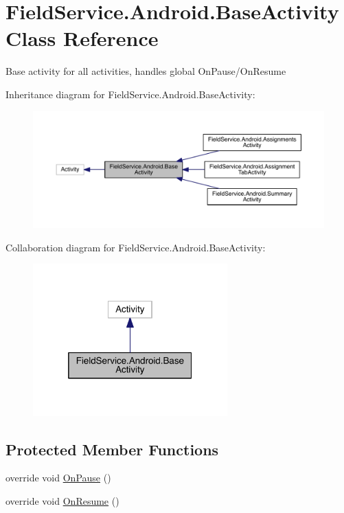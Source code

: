 \hypertarget{class_field_service_1_1_android_1_1_base_activity}{\section{Field\+Service.\+Android.\+Base\+Activity Class Reference}
\label{class_field_service_1_1_android_1_1_base_activity}
}


Base activity for all activities, handles global On\+Pause/\+On\+Resume  




Inheritance diagram for Field\+Service.\+Android.\+Base\+Activity\+:
\nopagebreak
\begin{figure}[H]
\begin{center}
\leavevmode
\includegraphics[width=350pt]{class_field_service_1_1_android_1_1_base_activity__inherit__graph}
\end{center}
\end{figure}


Collaboration diagram for Field\+Service.\+Android.\+Base\+Activity\+:
\nopagebreak
\begin{figure}[H]
\begin{center}
\leavevmode
\includegraphics[width=212pt]{class_field_service_1_1_android_1_1_base_activity__coll__graph}
\end{center}
\end{figure}
\subsection*{Protected Member Functions}
\begin{DoxyCompactItemize}
\item 
override void \hyperlink{class_field_service_1_1_android_1_1_base_activity_af542e4692d0b1aa3ad174ed5854492e4}{On\+Pause} ()
\item 
override void \hyperlink{class_field_service_1_1_android_1_1_base_activity_af7b6873bc81ed12458b1a935555b187d}{On\+Resume} ()
\end{DoxyCompactItemize}


